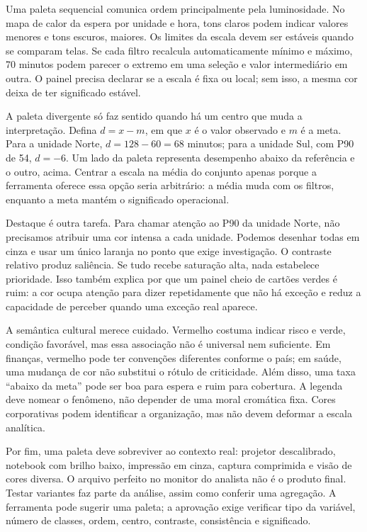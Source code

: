 Uma paleta sequencial comunica ordem principalmente pela luminosidade. No mapa de calor da espera por unidade e hora, tons claros podem indicar valores menores e tons escuros, maiores. Os limites da escala devem ser estáveis quando se comparam telas. Se cada filtro recalcula automaticamente mínimo e máximo, 70 minutos podem parecer o extremo em uma seleção e valor intermediário em outra. O painel precisa declarar se a escala é fixa ou local; sem isso, a mesma cor deixa de ter significado estável.

A paleta divergente só faz sentido quando há um centro que muda a interpretação. Defina $d=x-m$, em que $x$ é o valor observado e $m$ é a meta. Para a unidade Norte, $d=128-60=68$ minutos; para a unidade Sul, com P90 de 54, $d=-6$. Um lado da paleta representa desempenho abaixo da referência e o outro, acima. Centrar a escala na média do conjunto apenas porque a ferramenta oferece essa opção seria arbitrário: a média muda com os filtros, enquanto a meta mantém o significado operacional.

Destaque é outra tarefa. Para chamar atenção ao P90 da unidade Norte, não precisamos atribuir uma cor intensa a cada unidade. Podemos desenhar todas em cinza e usar um único laranja no ponto que exige investigação. O contraste relativo produz saliência. Se tudo recebe saturação alta, nada estabelece prioridade. Isso também explica por que um painel cheio de cartões verdes é ruim: a cor ocupa atenção para dizer repetidamente que não há exceção e reduz a capacidade de perceber quando uma exceção real aparece.

A semântica cultural merece cuidado. Vermelho costuma indicar risco e verde, condição favorável, mas essa associação não é universal nem suficiente. Em finanças, vermelho pode ter convenções diferentes conforme o país; em saúde, uma mudança de cor não substitui o rótulo de criticidade. Além disso, uma taxa ``abaixo da meta'' pode ser boa para espera e ruim para cobertura. A legenda deve nomear o fenômeno, não depender de uma moral cromática fixa. Cores corporativas podem identificar a organização, mas não devem deformar a escala analítica.

Por fim, uma paleta deve sobreviver ao contexto real: projetor descalibrado, notebook com brilho baixo, impressão em cinza, captura comprimida e visão de cores diversa. O arquivo perfeito no monitor do analista não é o produto final. Testar variantes faz parte da análise, assim como conferir uma agregação. A ferramenta pode sugerir uma paleta; a aprovação exige verificar tipo da variável, número de classes, ordem, centro, contraste, consistência e significado.

